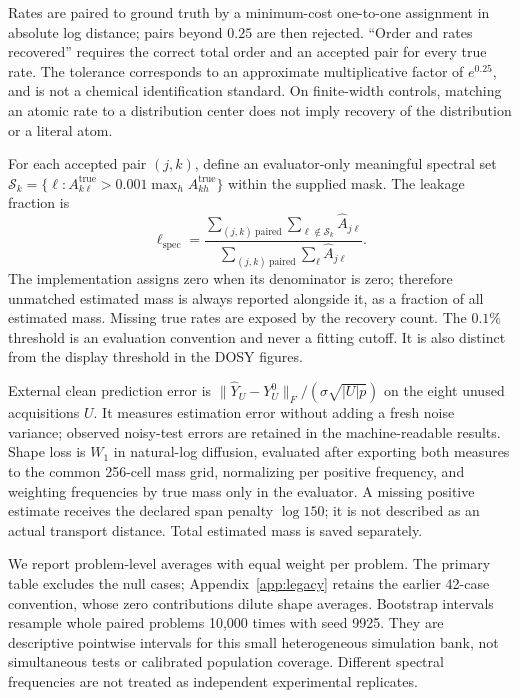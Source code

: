 Rates are paired to ground truth by a minimum-cost one-to-one assignment in absolute log distance; pairs beyond $0.25$ are then rejected. ``Order and rates recovered'' requires the correct total order and an accepted pair for every true rate. The tolerance corresponds to an approximate multiplicative factor of $e^{0.25}$, and is not a chemical identification standard. On finite-width controls, matching an atomic rate to a distribution center does not imply recovery of the distribution or a literal atom.

For each accepted pair $(j,k)$, define an evaluator-only meaningful spectral set
$\mathcal S_k=\{\ell:A^{\mathrm{true}}_{k\ell}>0.001\max_h A^{\mathrm{true}}_{kh}\}$ within the supplied mask. The leakage fraction is
\begin{equation}\label{eq:leakage}
 \ell_{\mathrm{spec}}=
 \frac{\sum_{(j,k)\ \mathrm{paired}}\sum_{\ell\notin\mathcal S_k}\widehat A_{j\ell}}
 {\sum_{(j,k)\ \mathrm{paired}}\sum_\ell\widehat A_{j\ell}}.
\end{equation}
The implementation assigns zero when its denominator is zero; therefore unmatched estimated mass is always reported alongside it, as a fraction of all estimated mass. Missing true rates are exposed by the recovery count. The $0.1\%$ threshold is an evaluation convention and never a fitting cutoff. It is also distinct from the display threshold in the DOSY figures.

External clean prediction error is $\|\widehat Y_U-Y_U^0\|_F/(\sigma\sqrt{|U|p})$ on the eight unused acquisitions $U$. It measures estimation error without adding a fresh noise variance; observed noisy-test errors are retained in the machine-readable results. Shape loss is $W_1$ in natural-log diffusion, evaluated after exporting both measures to the common 256-cell mass grid, normalizing per positive frequency, and weighting frequencies by true mass only in the evaluator. A missing positive estimate receives the declared span penalty $\log150$; it is not described as an actual transport distance. Total estimated mass is saved separately.

We report problem-level averages with equal weight per problem. The primary table excludes the null cases; Appendix~\ref{app:legacy} retains the earlier 42-case convention, whose zero contributions dilute shape averages. Bootstrap intervals resample whole paired problems 10,000 times with seed 9925. They are descriptive pointwise intervals for this small heterogeneous simulation bank, not simultaneous tests or calibrated population coverage. Different spectral frequencies are not treated as independent experimental replicates.

